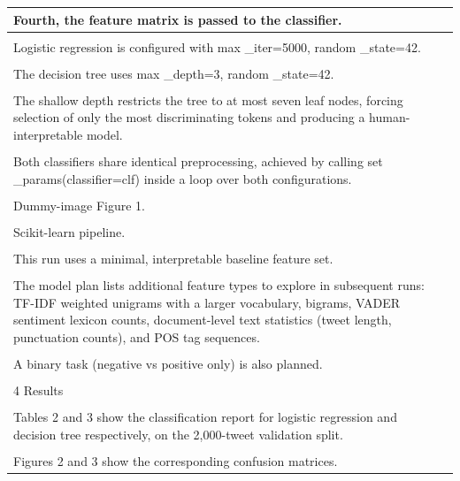 \documentclass[11pt]{article}
\begin{document}
\begin{longtable}{|p{}|p{}|}
\hline
Fourth, the feature matrix is passed to the classifier. & \\[2pt]
\hline
\rule{0pt}{3.5cm} & \\
\hline
Logistic regression is configured with max \_iter=5000, random \_state=42. & \\[2pt]
\hline
\rule{0pt}{3.5cm} & \\
\hline
The decision tree uses max \_depth=3, random \_state=42. & \\[2pt]
\hline
\rule{0pt}{3.5cm} & \\
\hline
The shallow depth restricts the tree to at most seven leaf nodes, forcing selection of only the most discriminating tokens and producing a human-interpretable model. & \\[2pt]
\hline
\rule{0pt}{3.5cm} & \\
\hline
Both classifiers share identical preprocessing, achieved by calling set \_params(classifier=clf) inside a loop over both configurations. & \\[2pt]
\hline
\rule{0pt}{3.5cm} & \\
\hline
Dummy-image Figure 1. & \\[2pt]
\hline
\rule{0pt}{3.5cm} & \\
\hline
Scikit-learn pipeline. & \\[2pt]
\hline
\rule{0pt}{3.5cm} & \\
\hline
This run uses a minimal, interpretable baseline feature set. & \\[2pt]
\hline
\rule{0pt}{3.5cm} & \\
\hline
The model plan lists additional feature types to explore in subsequent runs: TF-IDF weighted unigrams with a larger vocabulary, bigrams, VADER sentiment lexicon counts, document-level text statistics (tweet length, punctuation counts), and POS tag sequences. & \\[2pt]
\hline
\rule{0pt}{3.5cm} & \\
\hline
A binary task (negative vs positive only) is also planned. & \\[2pt]
\hline
\rule{0pt}{3.5cm} & \\
\hline
4 Results & \\[2pt]
\hline
\rule{0pt}{3.5cm} & \\
\hline
Tables 2 and 3 show the classification report for logistic regression and decision tree respectively, on the 2,000-tweet validation split. & \\[2pt]
\hline
\rule{0pt}{3.5cm} & \\
\hline
Figures 2 and 3 show the corresponding confusion matrices. & \\[2pt]

\end{longtable}
\end{document}
